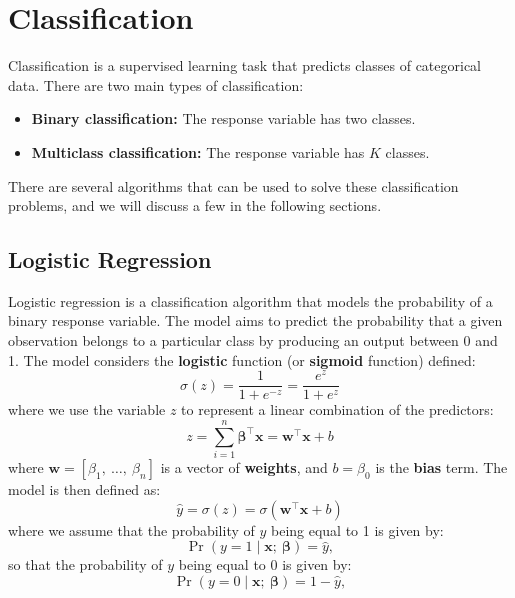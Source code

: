 \documentclass{article}
\begin{document}
\section{Classification}
Classification is a supervised learning task that predicts classes of
categorical data. There are two main types of classification:
\begin{itemize}
    \item \textbf{Binary classification:} The response variable has two classes.
    \item \textbf{Multiclass classification:} The response variable has \(K\) classes.
\end{itemize}
There are several algorithms that can be used to solve these
classification problems, and we will discuss a few in the following
sections.
\subsection{Logistic Regression}
Logistic regression is a classification algorithm that models the
probability of a binary response variable. The model aims to predict
the probability that a given observation belongs to a particular class
by producing an output between 0 and 1. The model considers the
\textbf{logistic} function (or \textbf{sigmoid} function) defined:
\begin{equation*}
    \sigma\left( z \right) = \frac{1}{1 + e^{-z}} = \frac{e^z}{1 + e^z}
\end{equation*}
where we use the variable \(z\) to represent a linear combination of
the predictors:
\begin{equation*}
    z = \sum_{i = 1}^n \symbf{\beta}^\top \symbf{x} = \symbf{w}^\top \symbf{x} + b
\end{equation*}
where \(\symbf{w} = \left[ \beta_1,\: \dots,\: \beta_n \right]\) is a
vector of \textbf{weights}, and \(b = \beta_0\) is the \textbf{bias} term.
The model is then defined as:
\begin{equation*}
    \hat{y} = \sigma\left( z \right) = \sigma\left( \symbf{w}^\top \symbf{x} + b \right)
\end{equation*}
where we assume that the probability of \(y\) being equal to 1 is given
by:
\begin{equation*}
    \Pr{\left( y = 1 \mid \symbf{x};\: \symbf{\beta} \right)} = \hat{y},
\end{equation*}
so that the probability of \(y\) being equal to 0 is given by:
\begin{equation*}
    \Pr{\left( y = 0 \mid \symbf{x};\: \symbf{\beta} \right)} = 1 - \hat{y},
\end{equation*}
\end{document}

